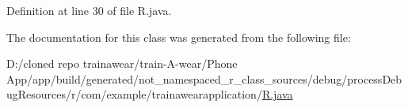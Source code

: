 Definition at line 30 of file R.\+java.



The documentation for this class was generated from the following file\+:\begin{DoxyCompactItemize}
\item 
D\+:/cloned repo trainawear/train-\/\+A-\/wear/\+Phone App/app/build/generated/not\+\_\+namespaced\+\_\+r\+\_\+class\+\_\+sources/debug/process\+Debug\+Resources/r/com/example/trainawearapplication/\mbox{\hyperlink{process_debug_resources_2r_2com_2example_2trainawearapplication_2_r_8java}{R.\+java}}\end{DoxyCompactItemize}
